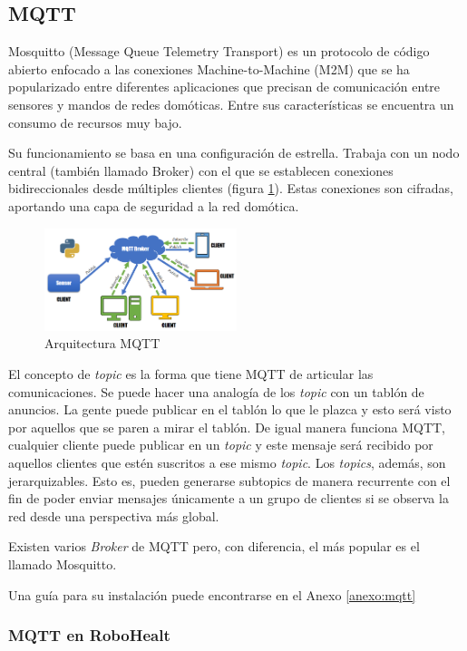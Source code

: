 \subsection{MQTT}

Mosquitto (Message Queue Telemetry Transport) es un protocolo de código abierto enfocado a las conexiones Machine-to-Machine (M2M) \cite{Vega:2016} que se ha popularizado entre diferentes aplicaciones que precisan de comunicación entre sensores y mandos de redes domóticas. Entre sus características se encuentra un consumo de recursos muy bajo.

Su funcionamiento se basa en una configuración de estrella. Trabaja con un nodo central (también llamado Broker) con el que se establecen conexiones bidireccionales desde múltiples clientes (figura \ref{fig:mqtt}). Estas conexiones son cifradas, aportando una capa de seguridad a la red domótica.

\begin{figure}[b]
\centering
\includegraphics[width=0.5\textwidth]{figuras/mqtt.png}
\caption{Arquitectura MQTT}
\label{fig:mqtt}
\end{figure}

El concepto de \textit{topic} es la forma que tiene MQTT de articular las comunicaciones. Se puede hacer una analogía de los \textit{topic} con un tablón de anuncios. La gente puede publicar en el tablón lo que le plazca y esto será visto por aquellos que se paren a mirar el tablón. De igual manera funciona MQTT, cualquier cliente puede publicar en un \textit{topic} y este mensaje será recibido por aquellos clientes que estén suscritos a ese mismo \textit{topic}. Los \textit{topics}, además, son jerarquizables. Esto es, pueden generarse subtopics de manera recurrente con el fin de poder enviar mensajes únicamente a un grupo de clientes si se observa la red desde una perspectiva más global.

Existen varios \textit{Broker} de MQTT pero, con diferencia, el más popular es el llamado Mosquitto.

Una guía para su instalación puede encontrarse en el Anexo \ref{anexo:mqtt}

\subsubsection{MQTT en RoboHealt}


